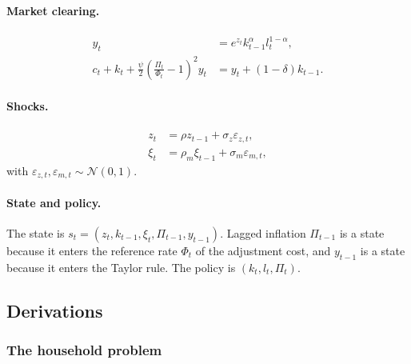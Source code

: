 \documentclass[11pt]{article}
\begin{document}
\paragraph{Market clearing.}
\begin{align}
y_t &= e^{z_t} k_{t-1}^{\alpha} l_t^{1-\alpha}, \\
c_t + k_t + \frac{\psi}{2} \left( \frac{\Pi_t}{\Phi_t} - 1 \right)^2 y_t &= y_t + (1-\delta) k_{t-1} .
\end{align}

\paragraph{Shocks.}
\begin{align}
z_t &= \rho z_{t-1} + \sigma_z \varepsilon_{z,t}, \\
\xi_t &= \rho_m \xi_{t-1} + \sigma_m \varepsilon_{m,t},
\end{align}
with $\varepsilon_{z,t}, \varepsilon_{m,t} \sim \mathcal{N}(0,1)$.

\paragraph{State and policy.} The state is $s_t = (z_t, k_{t-1}, \xi_t, \Pi_{t-1}, y_{t-1})$. Lagged inflation $\Pi_{t-1}$ is a state because it enters the reference rate $\Phi_t$ of the adjustment cost, and $y_{t-1}$ is a state because it enters the Taylor rule. The policy is $(k_t, l_t, \Pi_t)$.

\subsection{Derivations}

\subsubsection{The household problem}
\end{document}
